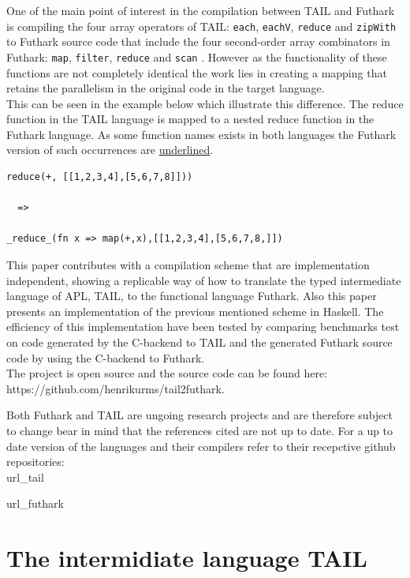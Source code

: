 \documentclass[11pt]{article}
\begin{document}
One of the main point of interest in the compilation between TAIL and Futhark is compiling the four array operators 
of TAIL: {\tt each}, {\tt eachV}, 
 {\tt reduce} and {\tt zipWith} to Futhark source code that include the four second-order array combinators in Futhark:  
 {\tt map}, {\tt filter}, {\tt reduce} and {\tt scan} \cite{ElsmanDybdal:Array:2014}\cite{TroelsHenriksen}. 
However as the functionality of these functions are not completely 
identical the work lies in creating a mapping that retains the parallelism in the original code in the target language.\\
This can be seen in the example below which illustrate this difference. The reduce function in the
TAIL language is mapped to a nested reduce function in the Futhark language.
As some function names exists in both languages the Futhark version of such occurrences are \underline{underlined}.

\begin{lstlisting}[numbers=none,frame=none]
reduce(+, [[1,2,3,4],[5,6,7,8]]))

  =>

_reduce_(fn x => map(+,x),[[1,2,3,4],[5,6,7,8,]])

\end{lstlisting}

This paper contributes with a compilation scheme that are implementation independent, showing a replicable 
way of how to translate the typed intermediate language of APL, TAIL, to the functional language Futhark. Also 
this paper presents an implementation of the previous mentioned scheme in Haskell. The efficiency of this
 implementation have been tested by comparing benchmarks test on code generated by the C-backend to TAIL 
 and the generated Futhark source code by using the C-backend to Futhark. \\

The project is open source and the source code can be found here:\\ https://github.com/henrikurms/tail2futhark.

Both Futhark and TAIL are ungoing research projects and are therefore subject to change bear in mind that the references cited are not up to date. For a up to date version of the languages and their compilers refer to their recepctive github repositories: \\

url\_tail 

url\_futhark

\section{The intermidiate language TAIL}
\end{document}
